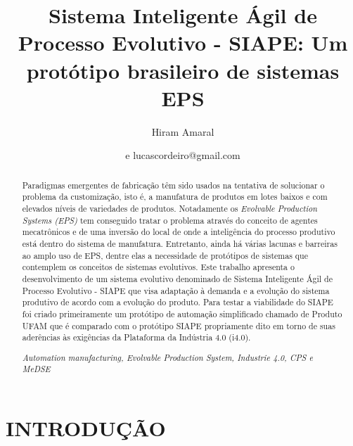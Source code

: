 \documentclass[10pt,letterpaper,twocolumn]{IEEEtran}
\author{Hiram Amaral}
\title{Sistema Inteligente Ágil de Processo Evolutivo - SIAPE: Um protótipo brasileiro de sistemas EPS}
\begin{document}
	
	
	\author{
		 e  lucascordeiro@gmail.com	}
	\maketitle
	\begin{abstract}
Paradigmas emergentes de fabricação têm sido usados na tentativa de solucionar o problema da customização, isto é, a manufatura de produtos em lotes baixos e com elevados níveis de variedades de produtos. Notadamente os \textit{Evolvable Production Systems (EPS)} tem conseguido tratar o problema através do conceito de agentes mecatrônicos e de uma inversão do local de onde a inteligência do processo produtivo está dentro do sistema de manufatura. Entretanto, ainda há várias lacunas e barreiras ao amplo uso de EPS, dentre elas a necessidade de protótipos de sistemas que contemplem os conceitos de sistemas evolutivos. Este trabalho apresenta o desenvolvimento de um sistema evolutivo denominado de Sistema Inteligente Ágil de Processo Evolutivo - SIAPE que visa adaptação à demanda e a evolução do sistema produtivo de acordo com a evolução do produto. Para testar a viabilidade do SIAPE foi criado primeiramente um protótipo de automação simplificado chamado de Produto UFAM que é comparado com o protótipo SIAPE propriamente dito em torno de suas aderências às exigências da Plataforma da Indústria 4.0 (i4.0).\par
		\begin{keywords}
			\it Automation manufacturing, Evolvable Production System, Industrie 4.0, CPS e MeDSE 
		\end{keywords}
	\end{abstract}
	
	\section{INTRODUÇÃO}
\end{document}
